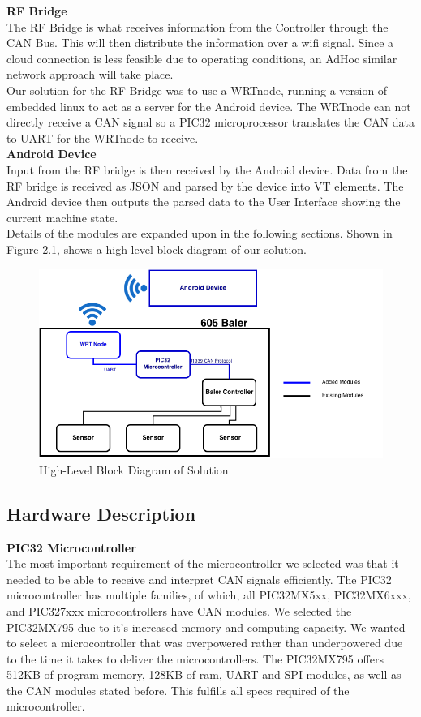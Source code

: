 \documentclass[paper=a4, fontsize=11pt]{scrartcl}
\numberwithin{equation}{section}		%
\numberwithin{figure}{section}			%
\numberwithin{table}{section}				%
\begin{document}
\textbf{RF Bridge} \\
The RF Bridge is what receives information from the Controller through the CAN Bus. This will then distribute the information over a wifi signal. Since a cloud connection is less feasible due to operating conditions,  an AdHoc similar network approach will take place. \\

Our solution for the RF Bridge was to use a WRTnode, running a version of embedded linux to act as a server for the Android device. The WRTnode can not directly receive a CAN signal so a PIC32 microprocessor translates the CAN data to UART for the WRTnode to receive. \\

\textbf{Android Device} \\
Input from the RF bridge is then received by the Android device. Data from the RF bridge is received as JSON and parsed by the device into VT elements. The Android device then outputs the parsed data to the User Interface showing the current machine state. \\

 Details of the modules are expanded upon in the following sections. Shown in Figure 2.1, shows a high level block diagram of our solution.  \\
 \begin{figure}[h]
	 \center\includegraphics[scale=0.3]{rev4.png}
 \caption{High-Level Block Diagram of Solution}
 \end{figure}

\pagebreak
\subsection{Hardware Description}
\textbf{PIC32 Microcontroller}  \\
The most important requirement of the microcontroller we selected was that it needed to be able to receive and interpret CAN signals efficiently. The PIC32 microcontroller has multiple families, of which, all PIC32MX5xx, PIC32MX6xxx, and PIC327xxx microcontrollers have CAN modules. We selected the PIC32MX795 due to it's increased memory and computing capacity. We wanted to select a microcontroller that was overpowered rather than underpowered due to the time it takes to deliver the microcontrollers. The PIC32MX795 offers 512KB of program memory, 128KB of ram, UART and SPI modules, as well as the CAN modules stated before. This fulfills all specs required of the microcontroller. \\
\end{document}
